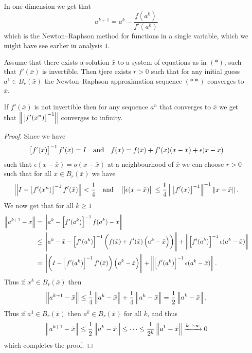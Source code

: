 \documentclass[11pt,a4paper]{article}
\begin{document}
\begin{remark}
  In one dimension we get that
  \[
    a^{k+1} = a^k - \frac{f(a^k)}{f'(a^k)}
  \]
  which is the Newton--Raphson method for functions in a single variable,
  which we might have see earlier in analysis $1$.
\end{remark}
\begin{proposition}
  Assume that there exists a solution $\bar x$ to a system of equations as
  in $(*)$, such that $f'(\bar x)$ is invertible.
  Then tjere exists $r > 0$ such that for any initial guess $a^1 \in B_r(\bar x)$
  the Newton--Raphson approximation sequence $(**)$ converges to $\bar x$.
\end{proposition}
\begin{remark}
  If $f'(\bar x)$ is not invertible then for any sequence $a^n$ that converges
  to $\bar x$ we get that $\left\lVert\left[f'(x^n)\right]^{-1}\right\rVert$ converges to
  infinity.
\end{remark}
\begin{proof}
  Since we have 
  \[
    \left[f'(\bar x)\right]^{-1} f'(\bar x) = I
    \quad \text{and} \quad
    f(x) = f(\bar x) + f'(\bar x)(x - \bar x) + \epsilon(x - \bar x)
  \]
  such that $\epsilon(x - \bar x) = o(x - \bar x)$ at a neighbourhood of
  $\bar x$ we can choose $r > 0$ such that for all $x \in B_r(\bar x)$
  we have
  \[
    \left\lVert I - \left[f'(x^n)\right]^{-1} f'(\bar x)\right\rVert < \frac{1}{4}
    \quad \text{and} \quad
    \left\lVert\epsilon(x - \bar x)\right\rVert \le
    \frac{1}{4} \left\lVert\left[f'(x)\right]^{-1}\right\rVert^{-1} \left\lVert x - \bar x\right\rVert.
  \]
  We now get that for all $k \geq 1$
  \begin{align*}
    \norm{a^{k+1} - \bar x} &=
    \norm{a^k - \left[f'(a^k)\right]^{-1} f(a^k) - \bar x} \\ &\le
    \norm{a^k - \bar x - \left[f'(a^k)\right]^{-1} \del{f(\bar x) +
      f'(\bar x)\del{a^k - \bar x}}} + \norm{\left[f'(a^k)\right]^{-1}
      \epsilon(a^k - \bar x)}\\ &=
    \norm{\del{I - \left[f'(a^k)\right]^{-1} f'(\bar x)} \del{a^k - \bar x}} +
      \norm{\left[f'(a^k)\right]^{-1} \epsilon(a^k - \bar x)}.
  \end{align*}
  Thus if $x^k \in B_r(\bar x)$ then
  \[
    \left\lVert a^{k+1} - \bar x\right\rVert \le
    \frac{1}{4} \left\lVert a^k - \bar x\right\rVert + \frac{1}{4} \left\lVert a^k - \bar x\right\rVert =
    \frac{1}{2} \left\lVert a^k - \bar x\right\rVert.
  \]
  Thus if $a^1 \in B_r(\bar x)$ then $a^k \in B_r(\bar x)$ for all $k$,
  and thus
  \[
    \left\lVert a^{k+1} - \bar x\right\rVert \le
    \frac{1}{2} \left\lVert a^k - \bar x\right\rVert \le \cdots \le
    \frac{1}{2^k} \left\lVert a^1 - \bar x\right\rVert \xrightarrow{k \to \infty} 0
  \]
  which completes the proof.
\end{proof}
\end{document}
